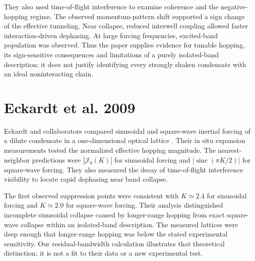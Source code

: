 \documentclass[11pt,oneside]{report}
\numberwithin{equation}{chapter}
\begin{document}
They also used time-of-flight interference to examine coherence and the negative-hopping regime. The observed momentum-pattern shift supported a sign change of the effective tunneling. Near collapse, reduced interwell coupling allowed faster interaction-driven dephasing. At large forcing frequencies, excited-band population was observed. Thus the paper supplies evidence for tunable hopping, its sign-sensitive consequences and limitations of a purely isolated-band description; it does not justify identifying every strongly shaken condensate with an ideal noninteracting chain.

\section{Eckardt et al. 2009}
Eckardt and collaborators compared sinusoidal and square-wave inertial forcing of a dilute condensate in a one-dimensional optical lattice \cite{Eckardt2009}. Their in situ expansion measurements tested the normalized effective hopping magnitude. The nearest-neighbor predictions were $|\mathcal J_0(K)|$ for sinusoidal forcing and $|\operatorname{sinc}(\pi K/2)|$ for square-wave forcing. They also measured the decay of time-of-flight interference visibility to locate rapid dephasing near band collapse.

The first observed suppression points were consistent with $K\simeq2.4$ for sinusoidal forcing and $K\simeq2.0$ for square-wave forcing. Their analysis distinguished incomplete sinusoidal collapse caused by longer-range hopping from exact square-wave collapse within an isolated-band description. The measured lattices were deep enough that longer-range hopping was below the stated experimental sensitivity. Our residual-bandwidth calculation illustrates that theoretical distinction; it is not a fit to their data or a new experimental test.
\end{document}
